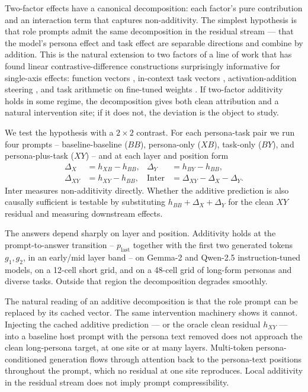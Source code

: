 \documentclass[11pt]{article}
\begin{document}
Two-factor effects have a canonical decomposition: each factor's pure contribution and an interaction term that captures non-additivity. The simplest hypothesis is that role prompts admit the same decomposition in the residual stream --- that the model's persona effect and task effect are separable directions and combine by addition. This is the natural extension to two factors of a line of work that has found linear contrastive-difference constructions surprisingly informative for single-axis effects: function vectors \cite{todd2024function}, in-context task vectors \cite{hendel2023icltask}, activation-addition steering \cite{turner2023actadd}, and task arithmetic on fine-tuned weights \cite{ilharco2023taskarith}. If two-factor additivity holds in some regime, the decomposition gives both clean attribution and a natural intervention site; if it does not, the deviation is the object to study.

We test the hypothesis with a $2\times2$ contrast. For each persona-task pair we run four prompts -- baseline-baseline ($BB$), persona-only ($XB$), task-only ($BY$), and persona-plus-task ($XY$) -- and at each layer and position form
\begin{align}
\Delta_X &= h_{XB} - h_{BB}, &
\Delta_Y &= h_{BY} - h_{BB}, \\
\Delta_{XY} &= h_{XY} - h_{BB}, &
\mathrm{Inter} &= \Delta_{XY} - \Delta_X - \Delta_Y.
\end{align}
$\mathrm{Inter}$ measures non-additivity directly. Whether the additive prediction is also causally sufficient is testable by substituting $h_{BB} + \Delta_X + \Delta_Y$ for the clean $XY$ residual and measuring downstream effects.

The answers depend sharply on layer and position. Additivity holds at the prompt-to-answer transition -- $p_{\text{last}}$ together with the first two generated tokens $g_1, g_2$, in an early/mid layer band -- on Gemma-2 and Qwen-2.5 instruction-tuned models, on a 12-cell short grid, and on a 48-cell grid of long-form personas and diverse tasks. Outside that region the decomposition degrades smoothly.

The natural reading of an additive decomposition is that the role prompt can be replaced by its cached vector. The same intervention machinery shows it cannot. Injecting the cached additive prediction --- or the oracle clean residual $h_{XY}$ --- into a baseline host prompt with the persona text removed does not approach the clean long-persona target, at one site or at many layers. Multi-token persona-conditioned generation flows through attention back to the persona-text positions throughout the prompt, which no residual at one site reproduces. Local additivity in the residual stream does not imply prompt compressibility.
\end{document}
